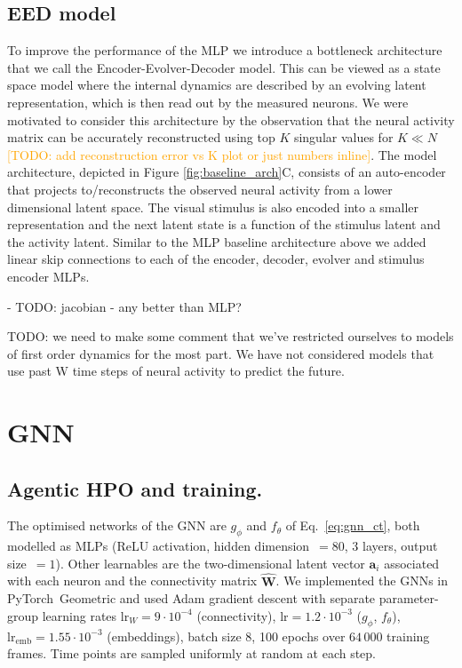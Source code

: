 \documentclass{article}
\newcommand{\comment}[1]{\textcolor{orange}{[#1]}}
\begin{document}
\subsection{EED model}

To improve the performance of the MLP we introduce a bottleneck architecture that we call the Encoder-Evolver-Decoder model. This can be viewed as a state space model where the internal dynamics are described by an evolving latent representation, which is then read out by the measured neurons. We were motivated to consider this architecture by the observation that the neural activity matrix can be accurately reconstructed using top $K$ singular values for $K \ll N$ \comment{TODO: add reconstruction error vs K plot or just numbers inline}. The model architecture, depicted in Figure \ref{fig:baseline_arch}C, consists of an auto-encoder that projects to/reconstructs the observed neural activity from a lower dimensional latent space. The visual stimulus is also encoded into a smaller representation and the next latent state is a function of the stimulus latent and the activity latent. Similar to the MLP baseline architecture above we added linear skip connections to each of the encoder, decoder, evolver and stimulus encoder MLPs. 


- TODO: jacobian - any better than MLP?

TODO: we need to make some comment that we've restricted ourselves to models of first order dynamics for the most part. We have not considered models that use past W time steps of neural activity to predict the future.


\newpage

\section{GNN}
\label{app:GNN}

\subsection{Agentic HPO and training.}
The optimised networks of the GNN are $g_\phi$ and $f_\theta$ of
Eq.~\ref{eq:gnn_ct}, both modelled as MLPs (ReLU activation,
hidden dimension~$=80$, $3$ layers, output size~$=1$). Other learnables are the two-dimensional
latent vector $\mathbf{a}_i$ associated with each neuron and the
connectivity matrix $\hat{\mathbf W}$. We implemented the GNNs in PyTorch~Geometric
\citep{fey_fast_2019} and used Adam gradient descent with separate
parameter-group learning rates 
$\text{lr}_W\!=\!9{\cdot}10^{-4}$ (connectivity),
$\text{lr}\!=\!1.2{\cdot}10^{-3}$ ($g_\phi$, $f_\theta$),
$\text{lr}_\text{emb}\!=\!1.55{\cdot}10^{-3}$ (embeddings), batch
size $8$, 100 epochs over $64\,000$ training frames. Time points are sampled uniformly at random at each step.
\end{document}
